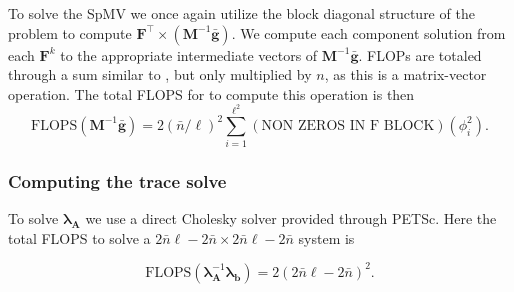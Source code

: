 %
%
%
To solve the SpMV we once again utilize the block diagonal structure of the problem to compute $\textbf{F}^\intercal \times (\textbf{M}^{-1}\bar{\textbf{g}})$. 
We compute each component solution from each $\textbf{F}^k$ to the appropriate intermediate vectors of $\textbf{M}^{-1}\bar{\textbf{g}}$.
FLOPs are totaled through a sum similar to , but only multiplied by $n$, as this is a matrix-vector operation.  
The total FLOPS for to compute this operation is then 
\begin{equation}
	\text{FLOPS}(\textbf{M}^{-1}\bar{\textbf{g}}) = 2 (\bar{n}/\ell)^2 \sum_{i=1}^{\ell^2} (\text{NON ZEROS IN F BLOCK}) (\phi_i^2).
\end{equation}

%
%
%
\subsubsection{Computing the trace solve}

%
%
%
To solve $\symbf{\lambda}_{\textbf{A}}$ we use a direct Cholesky solver provided through PETSc. 
Here the total FLOPS to solve a $2\bar{n}\ell - 2\bar{n} \times 2\bar{n}\ell - 2\bar{n}$ system is 

\begin{equation}
	\text{FLOPS}(\symbf{\lambda}_{\textbf{A}}^{-1}\symbf{\lambda}_{\textbf{b}}) = 2 (2\bar{n}\ell - 2\bar{n})^2.
\end{equation}

%






